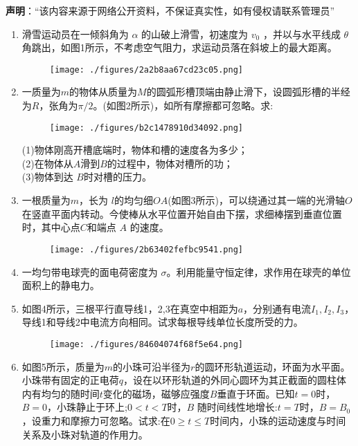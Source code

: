 
\textbf{声明}：“该内容来源于网络公开资料，不保证真实性，如有侵权请联系管理员”

\begin{enumerate}
\item 滑雪运动员在一倾斜角为 $\alpha$ 的山破上滑雪，初速度为 $v_0$ ，并以与水平线成 $\theta$ 角跳出，如图1所示，不考虑空气阻力，求运动员落在斜坡上的最大距离。
\begin{figure}[ht]
\centering
\texttt{[image: ./figures/2a2b8aa67cd23c05.png]}
\caption{} \label{fig_ZKYP03_1}
\end{figure}
\item 一质量为$m$的物体从质量为$M$的圆弧形槽顶端由静止滑下，设圆弧形槽的半经为$R$，张角为$\pi /2$。(如图2所示)，如所有摩擦都可忽略。求:\\
\begin{figure}[ht]
\centering
\texttt{[image: ./figures/b2c1478910d34092.png]}
\caption{} \label{fig_ZKYP03_2}
\end{figure}
(1)物体刚高开槽底端时，物体和槽的速度各为多少；\\
(2)在物体从$A$滑到$B$的过程中，物体对槽所的功；\\
(3)物体到达 $B $时对槽的压力。
\item 一根质量为$m$，长为  $l$的均匀细$OA$(如图3所示)，可以绕通过其一端的光滑轴$O$在竖直平面内转动。今使棒从水平位置开始自由下摆，求细棒摆到垂直位置时，其中心点$C$和端点 $A$ 的速度。
\begin{figure}[ht]
\centering
\texttt{[image: ./figures/2b63402fefbc9541.png]}
\caption{} \label{fig_ZKYP03_3}
\end{figure}
\item 一均匀带电球壳的面电荷密度为 $\sigma$。利用能量守恒定律，求作用在球壳的单位面积上的静电力。
\item 如图4所示，三根平行直导线1，2,3在真空中相距为$a$，分别通有电流$I_1,I_2,I_3$，导线1和导线2中电流方向相同。试求每根导线单位长度所受的力。
\begin{figure}[ht]
\centering
\texttt{[image: ./figures/84604074f68f5e64.png]}
\caption{} \label{fig_ZKYP03_4}
\end{figure}
\item 如图5所示，质量为$m$的小珠可沿半径为$r$的圆环形轨道运动，环面为水平面。小珠带有固定的正电荷$q$，设在以环形轨道的外同心圆环为其正截面的圆柱体内有均匀的随时间$t$变化的磁场，磁够应强度$B$垂直于环面。已知$t=0$时，$B=0$，小珠静止于环上;$0<t<T$时，$B$ 随时间线性地增长:$t=T$时，$B=B_0$，设重力和摩擦力可忽略。试求:在$0\ge t \le T$时间内，小珠的运动速度与时间关系及小珠对轨道的作用力。

\end{enumerate}
